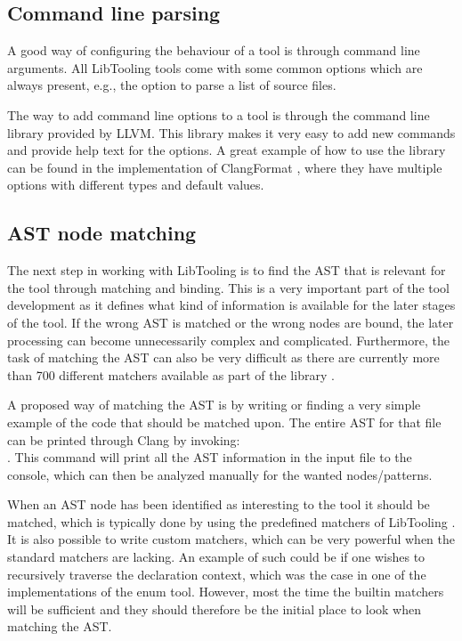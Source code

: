 \subsection{Command line parsing} \label{subsec:080dev:CMDLineParsing}

A good way of configuring the behaviour of a tool is through command line arguments. All LibTooling tools come with some common options which are always present, e.g., the option to parse a list of source files.

The way to add command line options to a tool is through the command line library provided by LLVM. This library makes it very easy to add new commands and provide help text for the options. A great example of how to use the library can be found in the implementation of ClangFormat \cite{clangClangFormatClangFormat2023}, where they have multiple options with different types and default values.

\subsection{AST node matching} \label{subsec:080dev:ASTNodeMatching}

The next step in working with LibTooling is to find the AST that is relevant for the tool through matching and binding. This is a very important part of the tool development as it defines what kind of information is available for the later stages of the tool. If the wrong AST is matched or the wrong nodes are bound, the later processing can become unnecessarily complex and complicated. Furthermore, the task of matching the AST can also be very difficult as there are currently more than 700 different matchers available as part of the library \cite{clangASTMatcherReference}. 

A proposed way of matching the AST is by writing or finding a very simple example of the code that should be matched upon. The entire AST for that file can be printed through Clang by invoking:\\ . 
This command will print all the AST information in the input file to the console, which can then be analyzed manually for the wanted nodes/patterns.

When an AST node has been identified as interesting to the tool it should be matched, which is typically done by using the predefined matchers of LibTooling \cite{clangASTMatcherReference}.
It is also possible to write custom matchers, which can be very powerful when the standard matchers are lacking. An example of such could be if one wishes to recursively traverse the declaration context, which was the case in one of the implementations of the enum tool.
However, most the time the builtin matchers will be sufficient and they should therefore be the initial place to look when matching the AST.

